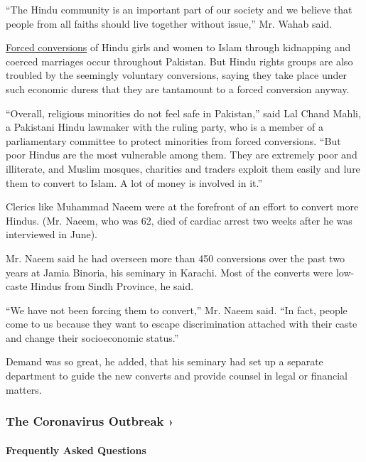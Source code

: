 ``The Hindu community is an important part of our society and we believe
that people from all faiths should live together without issue,'' Mr.
Wahab said.

\href{https://www.nytimes3xbfgragh.onion/2012/03/26/world/asia/pakistani-hindus-say-womans-conversion-to-islam-was-coerced.html}{Forced
conversions} of Hindu girls and women to Islam through kidnapping and
coerced marriages occur throughout Pakistan. But Hindu rights groups are
also troubled by the seemingly voluntary conversions, saying they take
place under such economic duress that they are tantamount to a forced
conversion anyway.

``Overall, religious minorities do not feel safe in Pakistan,'' said Lal
Chand Mahli, a Pakistani Hindu lawmaker with the ruling party, who is a
member of a parliamentary committee to protect minorities from forced
conversions. ``But poor Hindus are the most vulnerable among them. They
are extremely poor and illiterate, and Muslim mosques, charities and
traders exploit them easily and lure them to convert to Islam. A lot of
money is involved in it.''

Clerics like Muhammad Naeem were at the forefront of an effort to
convert more Hindus. (Mr. Naeem, who was 62, died of cardiac arrest two
weeks after he was interviewed in June).

Mr. Naeem said he had overseen more than 450 conversions over the past
two years at Jamia Binoria, his seminary in Karachi. Most of the
converts were low-caste Hindus from Sindh Province, he said.

``We have not been forcing them to convert,'' Mr. Naeem said. ``In fact,
people come to us because they want to escape discrimination attached
with their caste and change their socioeconomic status.''

Demand was so great, he added, that his seminary had set up a separate
department to guide the new converts and provide counsel in legal or
financial matters.

\href{https://www.nytimes3xbfgragh.onion/news-event/coronavirus?action=click\&pgtype=Article\&state=default\&region=MAIN_CONTENT_3\&context=storylines_faq}{}

\hypertarget{the-coronavirus-outbreak-}{%
\subsubsection{The Coronavirus Outbreak
›}\label{the-coronavirus-outbreak-}}

\hypertarget{frequently-asked-questions}{%
\paragraph{Frequently Asked
Questions}\label{frequently-asked-questions}}

